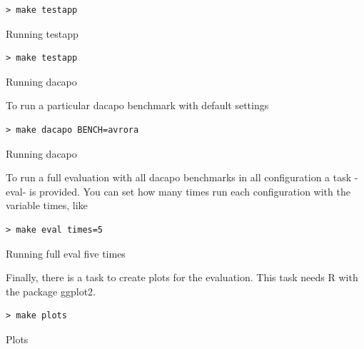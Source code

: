 \begin{listing}
\begin{verbatim}
> make testapp
\end{verbatim}
\caption{Running testapp}
\label{usage-parse2}
\end{listing}

\begin{listing}
\begin{verbatim}
> make testapp
\end{verbatim}
\caption{Running dacapo}
\label{usage-parse3}
\end{listing}

To run a particular dacapo benchmark with default settings

\begin{listing}
\begin{verbatim}
> make dacapo BENCH=avrora
\end{verbatim}
\caption{Running dacapo}
\label{usage-parse4}
\end{listing}

To run a full evaluation with all dacapo benchmarks in all configuration a task -eval- is provided. You can set how many times run each configuration with the variable times, like

\begin{listing}
\begin{verbatim}
> make eval times=5
\end{verbatim}
\caption{Running full eval five times}
\label{usage-parse5}
\end{listing}

Finally, there is a task to create plots for the evaluation.
This task needs R with the package ggplot2.

\begin{listing}
\begin{verbatim}
> make plots
\end{verbatim}
\caption{Plots}
\label{usage-parse6}
\end{listing}

%
%
